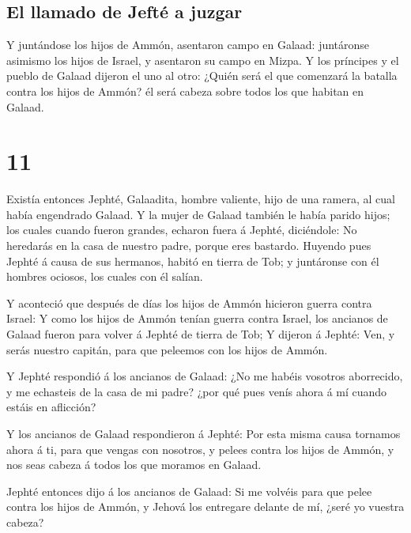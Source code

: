 \hypertarget{el-llamado-de-jeftuxe9-a-juzgar}{%
\subsection{El llamado de Jefté a
juzgar}\label{el-llamado-de-jeftuxe9-a-juzgar}}

 Y juntándose los hijos de Ammón, asentaron campo en
Galaad: juntáronse asimismo los hijos de Israel, y asentaron su campo en
Mizpa.  Y los príncipes y el pueblo de Galaad dijeron el
uno al otro: ¿Quién será el que comenzará la batalla contra los hijos de
Ammón? él será cabeza sobre todos los que habitan en Galaad.

\hypertarget{section-07-11}{%
\section{11}\label{section-07-11}}

 Existía entonces Jephté, Galaadita, hombre valiente, hijo
de una ramera, al cual había engendrado Galaad.  Y la
mujer de Galaad también le había parido hijos; los cuales cuando fueron
grandes, echaron fuera á Jephté, diciéndole: No heredarás en la casa de
nuestro padre, porque eres bastardo.  Huyendo pues Jephté
á causa de sus hermanos, habitó en tierra de Tob; y juntáronse con él
hombres ociosos, los cuales con él salían.

 Y aconteció que después de días los hijos de Ammón
hicieron guerra contra Israel:  Y como los hijos de Ammón
tenían guerra contra Israel, los ancianos de Galaad fueron para volver á
Jephté de tierra de Tob;  Y dijeron á Jephté: Ven, y serás
nuestro capitán, para que peleemos con los hijos de Ammón.

 Y Jephté respondió á los ancianos de Galaad: ¿No me
habéis vosotros aborrecido, y me echasteis de la casa de mi padre? ¿por
qué pues venís ahora á mí cuando estáis en aflicción?

 Y los ancianos de Galaad respondieron á Jephté: Por esta
misma causa tornamos ahora á ti, para que vengas con nosotros, y pelees
contra los hijos de Ammón, y nos seas cabeza á todos los que moramos en
Galaad.

 Jephté entonces dijo á los ancianos de Galaad: Si me
volvéis para que pelee contra los hijos de Ammón, y Jehová los entregare
delante de mí, ¿seré yo vuestra cabeza?

